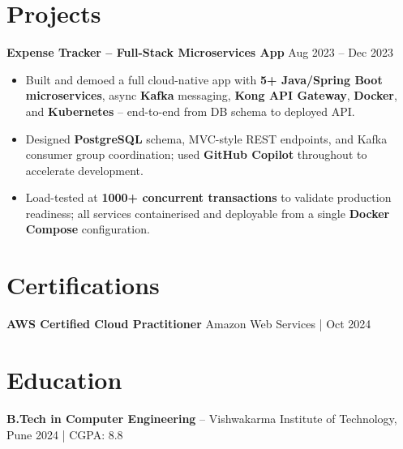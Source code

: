 \documentclass[letterpaper,10pt]{article}
\begin{document}
\section*{Projects}

\textbf{Expense Tracker -- Full-Stack Microservices App} \hfill Aug 2023 -- Dec 2023
\begin{itemize}[leftmargin=*]
    \item Built and demoed a full cloud-native app with \textbf{5+ Java/Spring Boot microservices}, async \textbf{Kafka} messaging, \textbf{Kong API Gateway}, \textbf{Docker}, and \textbf{Kubernetes} -- end-to-end from DB schema to deployed API.
    \item Designed \textbf{PostgreSQL} schema, MVC-style REST endpoints, and Kafka consumer group coordination; used \textbf{GitHub Copilot} throughout to accelerate development.
    \item Load-tested at \textbf{1000+ concurrent transactions} to validate production readiness; all services containerised and deployable from a single \textbf{Docker Compose} configuration.
\end{itemize}

\section*{Certifications}
\textbf{AWS Certified Cloud Practitioner} \hfill Amazon Web Services \;|\; Oct 2024

\section*{Education}
\textbf{B.Tech in Computer Engineering} -- Vishwakarma Institute of Technology, Pune \hfill 2024 \;|\; CGPA: 8.8
\end{document}
